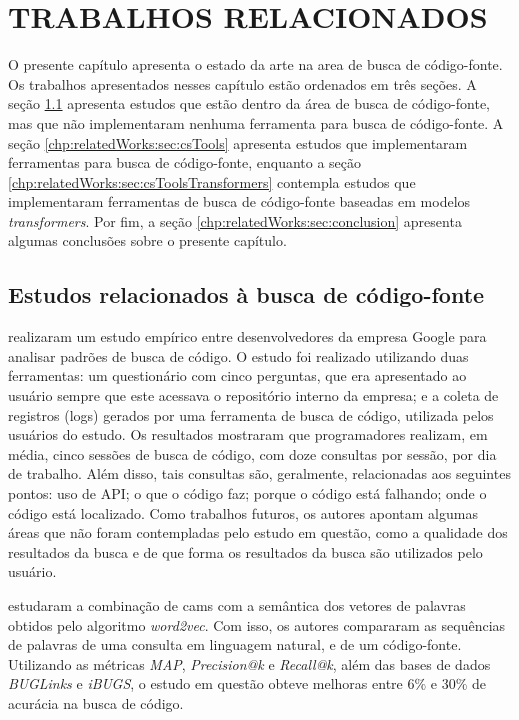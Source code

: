 \chapter{TRABALHOS RELACIONADOS}
\label{chp:relatedWorks}

O presente capítulo apresenta o estado da arte na area de busca de código-fonte. Os trabalhos apresentados nesses capítulo estão ordenados em três seções. A seção \ref{chp:relatedWorks:sec:csStudies} apresenta estudos que estão dentro da área de busca de código-fonte, mas que não implementaram nenhuma ferramenta para busca de código-fonte. A seção \ref{chp:relatedWorks:sec:csTools} apresenta estudos que implementaram ferramentas para busca de código-fonte, enquanto a seção \ref{chp:relatedWorks:sec:csToolsTransformers} contempla estudos que implementaram ferramentas de busca de código-fonte baseadas em modelos \textit{transformers}. Por fim, a seção \ref{chp:relatedWorks:sec:conclusion} apresenta algumas conclusões sobre o presente capítulo.

\section{Estudos relacionados à busca de código-fonte}
\label{chp:relatedWorks:sec:csStudies}

\textcite{Sadowski2015HowDS} realizaram um estudo empírico entre desenvolvedores da empresa Google para analisar padrões de busca de código. O estudo foi realizado utilizando duas ferramentas: um questionário com cinco perguntas, que era apresentado ao usuário sempre que este acessava o repositório interno da empresa; e a coleta de registros (logs) gerados por uma ferramenta de busca de código, utilizada pelos usuários do estudo. Os resultados mostraram que programadores realizam, em média, cinco sessões de busca de código, com doze consultas por sessão, por dia de trabalho. Além disso, tais consultas são, geralmente, relacionadas aos seguintes pontos: uso de API; o que o código faz; porque o código está falhando; onde o código está localizado. Como trabalhos futuros, os autores apontam algumas áreas que não foram contempladas pelo estudo em questão, como a qualidade dos resultados da busca e de que forma os resultados da busca são utilizados pelo usuário. 

\textcite{Akbar2019SCORSC} estudaram a combinação de \glspl{cam} com a semântica dos vetores de palavras obtidos pelo algoritmo \textit{word2vec}. Com isso, os autores compararam as sequências de palavras de uma consulta em linguagem natural, e de um código-fonte. Utilizando as métricas \textit{MAP}, \textit{Precision@k} e \textit{Recall@k}, além das bases de dados \textit{BUGLinks} e \textit{iBUGS}, o estudo em questão obteve melhoras entre $6\%$ e $30\%$ de acurácia na busca de código.

